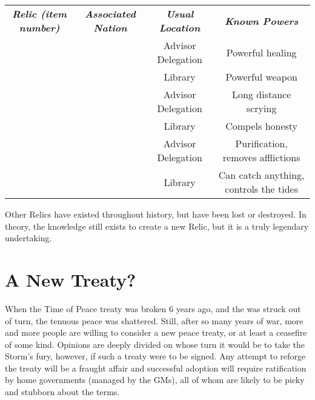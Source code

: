 \documentclass[blue]{GL2020}
\begin{document}
\begin{tabularx}{\textwidth}{|>{\centering\arraybackslash}c | >{\centering\arraybackslash}c | >{\centering\arraybackslash}c | >{\centering\arraybackslash}c |}
\hline
	\multicolumn{4}{|c|}{\textbf{The Relics}} \\
\hline
	\emph{\textbf{Relic (item number)}} & \emph{\textbf{Associated Nation}} & \emph{\textbf{Usual Location}} & \emph{\textbf{Known Powers}}\\
\hline
	\iPitcher{} & \pFarm{} & Advisor Delegation & Powerful healing\\
\hline
	\iScythe{} & \pFarm{} & Library & Powerful weapon\\
\hline
	\iMirror{} & \pTech{} & Advisor Delegation & Long distance scrying\\
\hline
	\iLariat{} & \pTech{} & Library & Compels honesty\\
\hline
	\iChalice{} & \pShip{} & Advisor Delegation & Purification, removes afflictions\\
\hline
	\iNet{} & \pShip{} & Library & Can catch anything, controls the tides\\
\hline
\end{tabularx}

Other Relics have existed throughout history, but have been lost or destroyed. In theory, the knowledge still exists to create a new Relic, but it is a truly legendary undertaking.

\section*{A New Treaty?}
When the Time of Peace treaty was broken 6 years ago, and the \pShip{} was struck out of turn, the tenuous peace was shattered. Still, after so many years of war, more and more people are willing to consider a new peace treaty, or at least a ceasefire of some kind. Opinions are deeply divided on whose turn it would be to take the Storm's fury, however, if such a treaty were to be signed. Any attempt to reforge the treaty will be a fraught affair and successful adoption will require ratification by home governments (managed by the GMs), all of whom are likely to be picky and stubborn about the terms.
\end{document}
